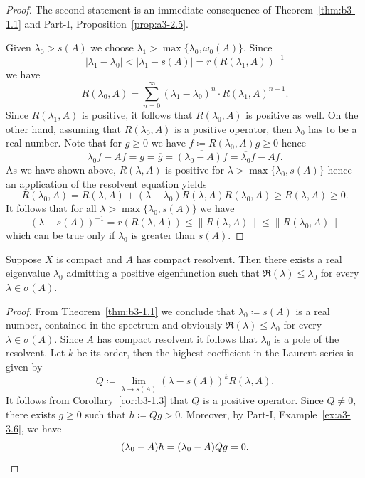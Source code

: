 \begin{proof}
	The second statement is an immediate consequence of Theorem~\ref{thm:b3-1.1} and Part-I, Proposition~\ref{prop:a3-2.5}.
	
	Given $\lambda_0 > s(A)$ we choose $\lambda_1 > \max\{\lambda_0,\omega_{0}(A)\}$.
	Since 
	\[
	\text{$|\lambda_1 - \lambda_0| < |\lambda_1 - s(A)| = r(R(\lambda_1,A))^{-1}$}
	\]
	we have
	\begin{equation}\label{eq:b3-1.10}
		R(\lambda_0,A) = \sum_{n=0}^{\infty} (\lambda_1 - \lambda_0)^n \cdot R(\lambda_1,A)^{n+1}.
	\end{equation}
	Since $R(\lambda_1,A)$ is positive, it follows that $R(\lambda_0,A)$ is positive as well.
	On the other hand, assuming that $R(\lambda_0,A)$ is a positive operator, then $\lambda_0$ has to be a real number.
	Note that for $g \geq 0$ we have $f \coloneq R(\lambda_0,A)g \geq 0$ hence 
\[
	\lambda_0f - Af = g = \overline{g} = \overline{(\lambda_0 - A)f} = \overline{\lambda_0}f - Af .
\]
%
As we have shown above, $R(\lambda,A)$ is positive for $\lambda > \max\{\lambda_0,s(A)\}$ hence an application of the resolvent equation yields
	\begin{equation}\label{eq:b3-1.11}
		R(\lambda_0,A) = R(\lambda,A) + (\lambda - \lambda_0)R(\lambda,A)R(\lambda_0,A) \geq R(\lambda,A) \geq 0.
	\end{equation}
	It follows that for all $\lambda > \max\{\lambda_{0},s(A)\}$ we have
	\begin{equation}\label{eq:b3-1.12}
		(\lambda - s(A))^{-1} = r(R(\lambda,A)) \leq \|R(\lambda,A)\| \leq \|R(\lambda_{0},A)\|
	\end{equation}
	which can be true only if\/ $\lambda_{0}$ is greater than $s(A)$.
\end{proof}
\begin{corollary}\label{cor:b3-1.4}
Suppose $X$ is compact and $A$ has compact resolvent.	
	Then there exists a real eigenvalue $\lambda_{0}$ admitting a positive eigenfunction such that 
	$\Re(\lambda) \leq \lambda_{0}$ for every $\lambda \in \sigma(A)$.
\end{corollary}
\begin{proof}
	From Theorem~\ref{thm:b3-1.1} we conclude that $\lambda_{0} \coloneq s(A)$ is a real number, contained in the spectrum and obviously $\Re(\lambda) \leq \lambda_{0}$ for every $\lambda \in \sigma(A)$.
	Since $A$ has compact resolvent it follows that $\lambda_{0}$ is a pole of the resolvent.
	Let $k$ be its order, then the highest coefficient in the Laurent series is given by
	\begin{equation}\label{eq:b3-1.13}
		Q \coloneq \lim_{\lambda \to s(A)} (\lambda - s(A))^{k}R(\lambda,A) .
	\end{equation}
It follows from Corollary~\ref{cor:b3-1.3} that $Q$ is a positive operator.
Since $Q \neq 0$, there exists $g \geq 0$ such that $h \coloneq Qg > 0$.
Moreover, by Part-I, Example~\ref{ex:a3-3.6}, we have 
%
\begin{equation*}
	 (\lambda_{0} - A)h = (\lambda_{0} - A)Qg = 0 .
     \qedhere
\end{equation*}
%
\end{proof}
